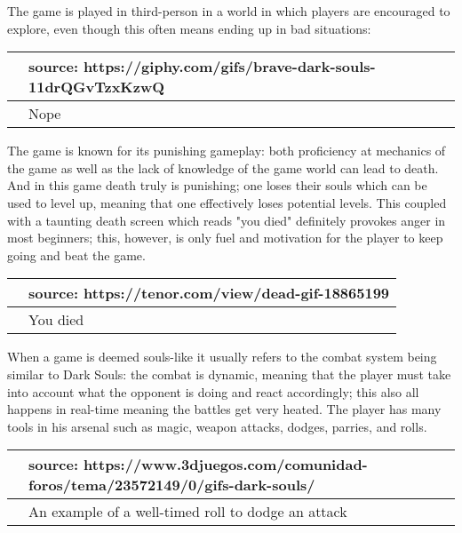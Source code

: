 \documentclass[a4paper,10pt]{book}
\begin{document}
          The game is played in third-person in a world in which players are encouraged to explore, even though this often means ending up in
          bad situations:
         
 
 \begin{longtable}{p{1mm}|l|}\hline
 
 &    source: https://giphy.com/gifs/brave-dark-souls-11drQGvTzxKzwQ  
 \\\hline
 
 & Nope 
 \\\hline
 \end{longtable}
 
 
          The game is known for its punishing gameplay: both proficiency at mechanics of the game as well as the lack of
          knowledge of the game world can lead to death. And in this game death truly is punishing; one loses
          their souls which can be used to level up, meaning that one effectively loses potential levels. This coupled with
          a taunting death screen which reads "you died" definitely provokes anger in most beginners; this, however, is only
          fuel and motivation for the player to keep going and beat the game.
           
 
 \begin{longtable}{p{1mm}|l|}\hline
 
 &   source: https://tenor.com/view/dead-gif-18865199  
 \\\hline
 
 & You died 
 \\\hline
 \end{longtable}
 
 
          When a game is deemed souls-like it usually refers to the combat system being similar to Dark Souls: the combat is
          dynamic, meaning that the player must take into account what the opponent is doing and react accordingly; this also
          all happens in real-time meaning the battles get very heated. The player has many tools in his arsenal such as magic,
          weapon attacks, dodges, parries, and rolls.
           
 
 \begin{longtable}{p{1mm}|l|}\hline
 
 &   source: https://www.3djuegos.com/comunidad-foros/tema/23572149/0/gifs-dark-souls/  
 \\\hline
 
 & An example of a well-timed roll to dodge an attack 
 \\\hline
 \end{longtable}
 
\end{document}
